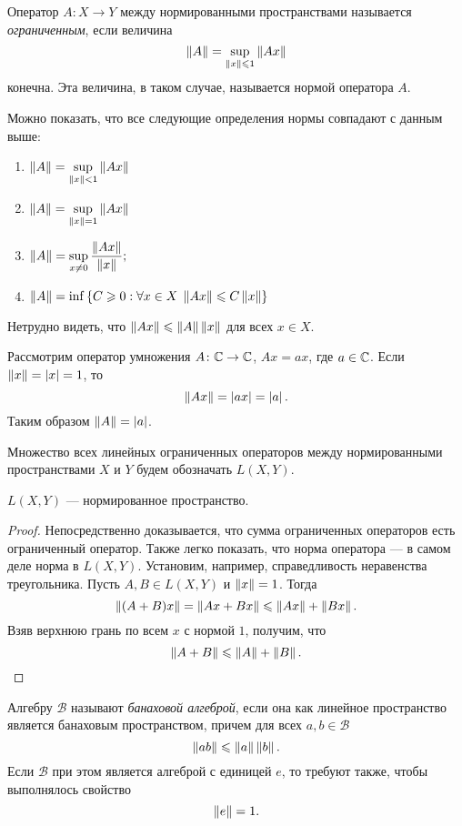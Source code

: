 \begin{definition}
    Оператор $A \colon X \to Y$ между нормированными пространствами 
    называется \emph{ограниченным}, если величина
    \[ \left\|A\right\| = \sup_{\left\|x\right\| \leqslant 1} \left\|Ax\right\| \]
    конечна. Эта величина, в таком случае, называется нормой оператора $A$.
\end{definition}

Можно показать, что все следующие определения нормы совпадают с данным выше:
\begin{enumerate}
    \item $ \left\|A\right\| = \sup\limits_{\left\|x\right\| < 1} \left\|Ax\right\| $
    \item $ \left\|A\right\| = \sup\limits_{\left\|x\right\| = 1} \left\|Ax\right\| $
    \item $ \left\|A\right\| = \sup\limits_{x\neq 0}\displaystyle\frac{\left\|Ax\right\|}{\left\|x\right\|}; $
    \item $ \left\|A\right\| = \inf\left\{C \geqslant 0 : \forall x \in X \; \left\|Ax\right\| \leqslant C
        \left\|x\right\|\right\} $
\end{enumerate}

Нетрудно видеть, что $\left\|Ax\right\| \leqslant \left\|A\right\|\left\|x\right\|$ для всех $x \in X$.

\begin{example}
    Рассмотрим оператор умножения $A \colon \mathbb{C} \to \mathbb{C}$, $Ax = ax$,
    где $a \in \mathbb{C}$. Если $\left\|x\right\| = \left|x\right| = 1$, то 
    \[ \left\|Ax\right\| = \left|ax\right| = \left|a\right|. \]
    Таким образом $\left\|A\right\| = \left|a\right|$.
\end{example}

Множество всех линейных ограниченных операторов между нормированными
пространствами $X$ и $Y$ будем обозначать $L(X, Y)$.

\begin{theorem}
    $L(X, Y)$ --- нормированное пространство.
\end{theorem}

\begin{proof}
    Непосредственно доказывается, что сумма ограниченных
    операторов есть ограниченный оператор. Также легко показать, что норма
    оператора --- в самом деле норма в $L(X, Y)$. Установим, например,
    справедливость неравенства треугольника. Пусть $A, B \in L(X, Y)$ и
    $\left\|x\right\| = 1$. Тогда
    \[ \left\|(A+B)x\right\| = \left\|Ax+Bx\right\| \leqslant \left\|Ax\right\| + \left\|Bx\right\|. \]
    Взяв верхнюю грань по всем $x$ с нормой $1$, получим, что 
    \[ \left\|A + B\right\| \leqslant \left\|A\right\| + \left\|B\right\|. \]
\end{proof}

\begin{definition}
    Алгебру $\mathcal B$ называют \emph{банаховой алгеброй}, если она как линейное пространство
    является банаховым пространством, причем для всех $a, b \in \mathcal B$
    \[ \left\|ab\right\| \leqslant \left\|a\right\|\left\|b\right\|. \]
    Если $\mathcal B$ при этом является алгеброй с единицей $e$, то требуют также, 
    чтобы выполнялось свойство
    \[ \left\|e\right\| = 1. \]
\end{definition}


